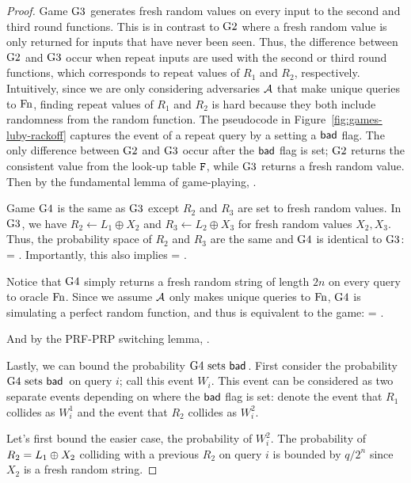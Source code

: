 \begin{proof}
Game ${{\textnormal G}}3$ generates fresh random values on every input to the second and third round functions.
This is in contrast to ${{\textnormal G}}2$ where a fresh random value is only returned for inputs that have never been seen.
Thus, the difference between ${{\textnormal G}}2$ and ${{\textnormal G}}3$ occur when repeat inputs are used with the second or third round functions, which corresponds to repeat values of $R_1$ and $R_2$, respectively.
Intuitively, since we are only considering adversaries ${\mathcal A}$ that make unique queries to $\textnormal{Fn}$, finding repeat values of $R_1$ and $R_2$ is hard because they both include randomness from the random function.
The pseudocode in Figure~\ref{fig:games-luby-rackoff} captures the event of a repeat query by a setting a $\mathsf{bad}$ flag.
The only difference between ${{\textnormal G}}2$ and ${{\textnormal G}}3$ occur after the $\mathsf{bad}$ flag is set; ${{\textnormal G}}2$ returns the consistent value from the look-up table $\mathtt{F}$, while ${{\textnormal G}}3$ returns a fresh random value.
Then by the fundamental lemma of game-playing,
\bnm
{} \le {}.
\enm

Game ${{\textnormal G}}4$ is the same as ${{\textnormal G}}3$ except $R_2$ and $R_3$ are set to fresh random values.
In ${{\textnormal G}}3$, we have $R_2\gets L_1\oplus X_2$ and $R_3\gets L_2\oplus X_3$ for fresh random values $X_2,X_3$.
Thus, the probability space of $R_2$ and $R_3$ are the same and ${{\textnormal G}}4$ is identical to ${{\textnormal G}}3$:
\bnm
{} = .
\enm
Importantly, this also implies
\bnm
{} = .
\enm

Notice that ${{\textnormal G}}4$ simply returns a fresh random string of length $2n$ on every query to oracle $\textnormal{Fn}$.
Since we assume ${\mathcal A}$ only makes unique queries to $\textnormal{Fn}$, ${{\textnormal G}}4$ is simulating a perfect random function, and thus is equivalent to the  game:
\bnm
{} = .
\enm

And by the PRF-PRP switching lemma,
	\bnm
	 \le {}  \;.
	\enm

Lastly, we can bound the probability ${{\textnormal G}}4\mbox{~\textup{sets} $\mathsf{bad}$}\,$.
First consider the probability ${{\textnormal G}}4\mbox{~\textup{sets} $\mathsf{bad}$}\,$ on query $i$; call this event $W_i$.
This event can be considered as two separate events depending on where the $\mathsf{bad}$ flag is set:
denote the event that $R_1$ collides as $W_i^1$ and the event that $R_2$ collides as $W_i^2$.

Let's first bound the easier case, the probability of $W_i^2$.
The probability of $R_2 = L_1 {\:\oplus\:} X_2$ colliding with a previous $R_2$ on query $i$ is bounded by $q/2^n$ since $X_2$ is a fresh random string.


\end{proof}
